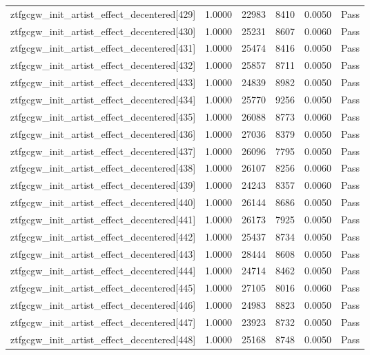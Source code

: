 \begin{table}[htbp]
\begin{tabular}{llrrll}
ztfgcgw\_init\_artist\_effect\_decentered[429] & 1.0000 & 22983 & 8410 & 0.0050 & Pass \\
ztfgcgw\_init\_artist\_effect\_decentered[430] & 1.0000 & 25231 & 8607 & 0.0060 & Pass \\
ztfgcgw\_init\_artist\_effect\_decentered[431] & 1.0000 & 25474 & 8416 & 0.0050 & Pass \\
ztfgcgw\_init\_artist\_effect\_decentered[432] & 1.0000 & 25857 & 8711 & 0.0050 & Pass \\
ztfgcgw\_init\_artist\_effect\_decentered[433] & 1.0000 & 24839 & 8982 & 0.0050 & Pass \\
ztfgcgw\_init\_artist\_effect\_decentered[434] & 1.0000 & 25770 & 9256 & 0.0050 & Pass \\
ztfgcgw\_init\_artist\_effect\_decentered[435] & 1.0000 & 26088 & 8773 & 0.0060 & Pass \\
ztfgcgw\_init\_artist\_effect\_decentered[436] & 1.0000 & 27036 & 8379 & 0.0050 & Pass \\
ztfgcgw\_init\_artist\_effect\_decentered[437] & 1.0000 & 26096 & 7795 & 0.0050 & Pass \\
ztfgcgw\_init\_artist\_effect\_decentered[438] & 1.0000 & 26107 & 8256 & 0.0060 & Pass \\
ztfgcgw\_init\_artist\_effect\_decentered[439] & 1.0000 & 24243 & 8357 & 0.0060 & Pass \\
ztfgcgw\_init\_artist\_effect\_decentered[440] & 1.0000 & 26144 & 8686 & 0.0050 & Pass \\
ztfgcgw\_init\_artist\_effect\_decentered[441] & 1.0000 & 26173 & 7925 & 0.0050 & Pass \\
ztfgcgw\_init\_artist\_effect\_decentered[442] & 1.0000 & 25437 & 8734 & 0.0050 & Pass \\
ztfgcgw\_init\_artist\_effect\_decentered[443] & 1.0000 & 28444 & 8608 & 0.0050 & Pass \\
ztfgcgw\_init\_artist\_effect\_decentered[444] & 1.0000 & 24714 & 8462 & 0.0050 & Pass \\
ztfgcgw\_init\_artist\_effect\_decentered[445] & 1.0000 & 27105 & 8016 & 0.0060 & Pass \\
ztfgcgw\_init\_artist\_effect\_decentered[446] & 1.0000 & 24983 & 8823 & 0.0050 & Pass \\
ztfgcgw\_init\_artist\_effect\_decentered[447] & 1.0000 & 23923 & 8732 & 0.0050 & Pass \\
ztfgcgw\_init\_artist\_effect\_decentered[448] & 1.0000 & 25168 & 8748 & 0.0050 & Pass \\

\end{tabular}
\end{table}

